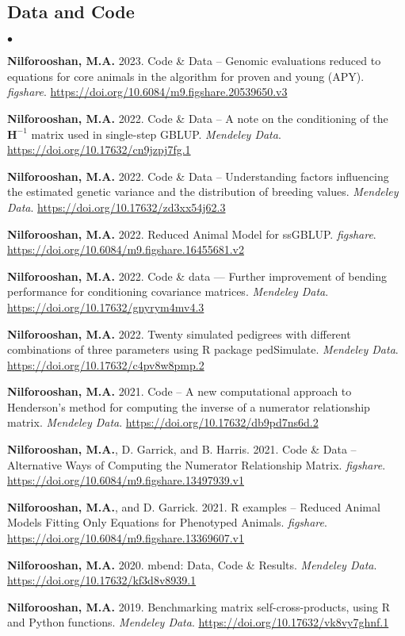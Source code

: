 \documentclass[margin,line]{res}
\newenvironment{list2}{
  \begin{list}{$\bullet$}{%
      \setlength{\itemsep}{0in}
      \setlength{\parsep}{0in} \setlength{\parskip}{0in}
      \setlength{\topsep}{0in} \setlength{\partopsep}{0in}
      \setlength{\leftmargin}{0.2in}}}{\end{list}}
\begin{document}
\begin{resume}
  \section{\sc Data and Code}

  \begin{list2}
    \item {\bf Nilforooshan, M.A.} 2023. Code \& Data -- Genomic evaluations reduced to equations for core animals in the algorithm for proven and young (APY). {\em figshare}. \url{https://doi.org/10.6084/m9.figshare.20539650.v3}
    \item {\bf Nilforooshan, M.A.} 2022. Code \& Data -- A note on the conditioning of the $\mathbf H^{-1}$ matrix used in single-step GBLUP. {\em Mendeley Data}. \url{https://doi.org/10.17632/cn9jzpj7fg.1}
    \item {\bf Nilforooshan, M.A.} 2022. Code \& Data -- Understanding factors influencing the estimated genetic variance and the distribution of breeding values. {\em Mendeley Data}. \url{https://doi.org/10.17632/zd3xx54j62.3}
    \item {\bf Nilforooshan, M.A.} 2022. Reduced Animal Model for ssGBLUP. {\em figshare}. \url{https://doi.org/10.6084/m9.figshare.16455681.v2}
    \item {\bf Nilforooshan, M.A.} 2022. Code \& data --- Further improvement of bending performance for conditioning covariance matrices. {\em Mendeley Data}. \url{https://doi.org/10.17632/gnyrym4mv4.3}
    \item {\bf Nilforooshan, M.A.} 2022. Twenty simulated pedigrees with different combinations of three parameters using R package pedSimulate. {\em Mendeley Data}. \url{https://doi.org/10.17632/c4pv8w8pmp.2}
    \item {\bf Nilforooshan, M.A.} 2021. Code -- A new computational approach to Henderson's method for computing the inverse of a numerator relationship matrix. {\em Mendeley Data}. \url{https://doi.org/10.17632/db9pd7ns6d.2}
    \item {\bf Nilforooshan, M.A.}, D. Garrick, and B. Harris. 2021. Code \& Data -- Alternative Ways of Computing the Numerator Relationship Matrix. {\em figshare}. \url{https://doi.org/10.6084/m9.figshare.13497939.v1}
    \item {\bf Nilforooshan, M.A.}, and D. Garrick. 2021. R examples -- Reduced Animal Models Fitting Only Equations for Phenotyped Animals. {\em figshare}. \url{https://doi.org/10.6084/m9.figshare.13369607.v1}
    \item {\bf Nilforooshan, M.A.} 2020. mbend: Data, Code \& Results. {\em Mendeley Data}. \url{https://doi.org/10.17632/kf3d8v8939.1}
    \item {\bf Nilforooshan, M.A.} 2019. Benchmarking matrix self-cross-products, using R and Python functions. {\em Mendeley Data}. \url{https://doi.org/10.17632/vk8vy7ghnf.1}
  \end{list2}

\end{resume}
\end{document}
